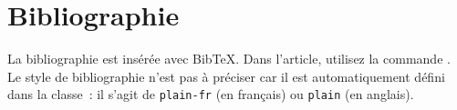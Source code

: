 \documentclass[francais]{gretsi}
\begin{document}

\section{Bibliographie}

La bibliographie est insérée avec Bib\TeX.
Dans l'article, utilisez la commande \verb!!.
Le style de bibliographie n'est pas à préciser car il est automatiquement défini dans la classe~:
il s'agit de \texttt{plain-fr} (en français) ou \texttt{plain} (en anglais).



\nocite{*} %

\end{document}
